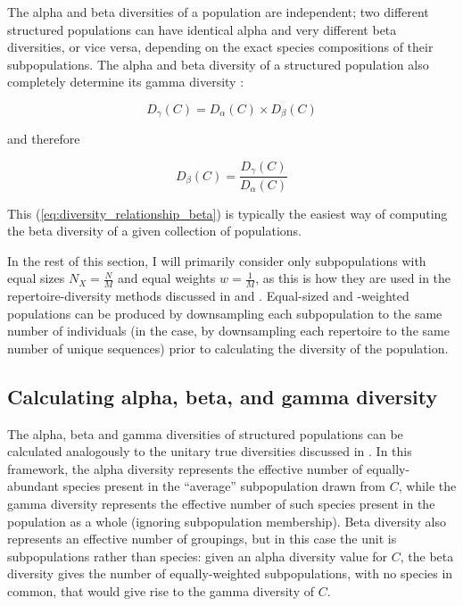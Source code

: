 \noindent The alpha and beta diversities of a population are independent; two different structured populations can have identical alpha and very different beta diversities, or vice versa, depending on the exact species compositions of their subpopulations. The alpha and beta diversity of a structured population also completely determine its gamma diversity \citep{jost2007partitioning}:

\begin{equation}
D_\gamma(C) = D_\alpha(C) \times D_\beta(C)
\label{eq:diversity_relationship_gamma}
\end{equation}

\noindent and therefore 

\begin{equation}
D_\beta(C) = \frac{D_\gamma(C)}{D_\alpha(C)}
\label{eq:diversity_relationship_beta}
\end{equation}

\noindent This (\autoref{eq:diversity_relationship_beta}) is typically the easiest way of computing the beta diversity of a given collection of populations.

In the rest of this section, I will primarily consider only subpopulations with equal sizes $N_X = \frac{N}{M}$ and equal weights $w = \frac{1}{M}$, as this is how they are used in the repertoire-diversity methods discussed in  and . Equal-sized and -weighted populations can be produced by downsampling each subpopulation to the same number of individuals (in the \igseq case, by downsampling each repertoire to the same number of unique sequences) prior to calculating the diversity of the population.
 
\subsection{Calculating alpha, beta, and gamma diversity}
\label{app:diversity-structured-calc}

The alpha, beta and gamma diversities of structured populations can be calculated analogously to the unitary true diversities discussed in . In this framework, the alpha diversity represents the effective number of equally-abundant species present in the ``average'' subpopulation drawn from $C$, while the gamma diversity represents the effective number of such species present in the population as a whole (ignoring subpopulation membership). Beta diversity also represents an effective number of groupings, but in this case the unit is subpopulations rather than species: given an alpha diversity value for $C$, the beta diversity gives the number of equally-weighted subpopulations, with no species in common, that would give rise to the gamma diversity of $C$.

